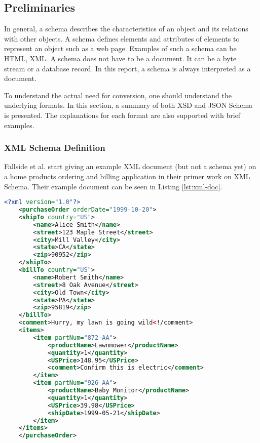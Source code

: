 \subsection{Preliminaries}
In general, a schema describes the characteristics of an object and its
relations with other objects. A schema defines elements and attributes of
elements to represent an object such as a web page. Examples of such a schema
can be HTML, XML. A schema does not have to be a document. It can be a byte
stream or a database record. In this report, a schema is always interpreted as a
document.

To understand the actual need for conversion, one should understand the
underlying formats. In this section, a summary of both XSD and JSON Schema is
presented. The explanations for each format are also supported with brief
examples.

\subsubsection{XML Schema Definition}
Fallside et al. \autocite{Fallside} start giving an example XML document (but
not a schema yet) on a home products ordering and billing application in their
primer work on XML Schema. Their example document can be seen in Listing \ref{lst:xml-doc}.

\begin{lstlisting}[language = XML, caption = {An XML document for a home products ordering and billing application.}, captionpos = b, label = lst:xml-doc]
    <?xml version="1.0"?>
    <purchaseOrder orderDate="1999-10-20">
    <shipTo country="US">
        <name>Alice Smith</name>
        <street>123 Maple Street</street>
        <city>Mill Valley</city>
        <state>CA</state>
        <zip>90952</zip>
    </shipTo>
    <billTo country="US">
        <name>Robert Smith</name>
        <street>8 Oak Avenue</street>
        <city>Old Town</city>
        <state>PA</state>
        <zip>95819</zip>
    </billTo>
    <comment>Hurry, my lawn is going wild<!/comment>
    <items>
        <item partNum="872-AA">
            <productName>Lawnmower</productName>
            <quantity>1</quantity>
            <USPrice>148.95</USPrice>
            <comment>Confirm this is electric</comment>
        </item>
        <item partNum="926-AA">
            <productName>Baby Monitor</productName>
            <quantity>1</quantity>
            <USPrice>39.98</USPrice>
            <shipDate>1999-05-21</shipDate>
        </item>
    </items>
    </purchaseOrder>
\end{lstlisting}

